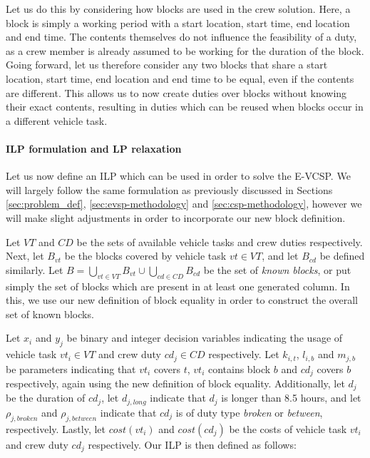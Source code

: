 \documentclass[]{article}
\begin{document}
Let us do this by considering how blocks are used in the crew solution. Here, a block is simply a working period with a start location, start time, end location and end time. The contents themselves do not influence the feasibility of a duty, as a crew member is already assumed to be working for the duration of the block. Going forward, let us therefore consider any two blocks that share a start location, start time, end location and end time to be equal, even if the contents are different. This allows us to now create duties over blocks without knowing their exact contents, resulting in duties which can be reused when blocks occur in a different vehicle task. 

\paragraph{ILP formulation and LP relaxation} Let us now define an ILP which can be used in order to solve the E-VCSP. We will largely follow the same formulation as previously discussed in Sections \ref{sec:problem_def}, \ref{sec:evsp-methodology} and \ref{sec:csp-methodology}, however we will make slight adjustments in order to incorporate our new block definition. 

Let $VT$ and $CD$ be the sets of available vehicle tasks and crew duties respectively. Next, let $B_{vt}$ be the blocks covered by vehicle task $vt \in VT$, and let $B_{cd}$ be defined similarly. Let $B = \bigcup_{vt \in VT} B_{vt} \cup \bigcup_{cd \in CD} B_{cd}$ be the set of \emph{known blocks}, or put simply the set of blocks which are present in at least one generated column. In this, we use our new definition of block equality in order to construct the overall set of known blocks. 

Let $x_i$ and $y_j$ be binary and integer decision variables indicating the usage of vehicle task $vt_i \in VT$ and crew duty $cd_j \in CD$ respectively. Let $k_{i,t}$, $l_{i,b}$ and $m_{j,b}$ be parameters indicating that $vt_i$ covers $t$, $vt_i$ contains block $b$ and $cd_j$ covers $b$ respectively, again using the new definition of block equality. Additionally, let $d_j$ be the duration of $cd_j$, let $d_{j,\textit{long}}$ indicate that $d_j$ is longer than 8.5 hours, and let $\rho_{j,\textit{broken}}$ and $\rho_{j,\textit{between}}$ indicate that $cd_j$ is of duty type \textit{broken} or \textit{between}, respectively. Lastly, let $cost(vt_i)$ and $cost(cd_j)$ be the costs of vehicle task $vt_i$ and crew duty $cd_j$ respectively. Our ILP is then defined as follows:
\end{document}
